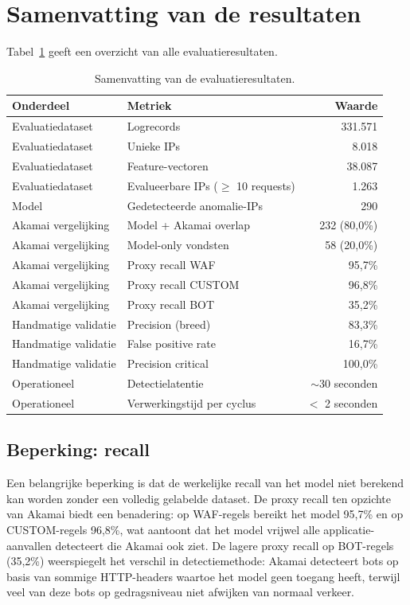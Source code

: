 \section{Samenvatting van de resultaten}
\label{sec:samenvatting-resultaten}
 
Tabel~\ref{tab:samenvatting-resultaten} geeft een overzicht van alle evaluatieresultaten.
 
\begin{table}[h]
\centering
\caption{Samenvatting van de evaluatieresultaten.}
\label{tab:samenvatting-resultaten}
\begin{tabular}{l l r}
\hline
\textbf{Onderdeel} & \textbf{Metriek} & \textbf{Waarde} \\
\hline
Evaluatiedataset & Logrecords & 331.571 \\
Evaluatiedataset & Unieke IPs & 8.018 \\
Evaluatiedataset & Feature-vectoren & 38.087 \\
Evaluatiedataset & Evalueerbare IPs ($\geq$ 10 requests) & 1.263 \\
Model & Gedetecteerde anomalie-IPs & 290 \\
Akamai vergelijking & Model + Akamai overlap & 232 (80,0\%) \\
Akamai vergelijking & Model-only vondsten & 58 (20,0\%) \\
Akamai vergelijking & Proxy recall WAF & 95,7\% \\
Akamai vergelijking & Proxy recall CUSTOM & 96,8\% \\
Akamai vergelijking & Proxy recall BOT & 35,2\% \\
Handmatige validatie & Precision (breed) & 83,3\% \\
Handmatige validatie & False positive rate & 16,7\% \\
Handmatige validatie & Precision critical & 100,0\% \\
Operationeel & Detectielatentie & $\sim$30 seconden \\
Operationeel & Verwerkingstijd per cyclus & $<$ 2 seconden \\
\hline
\end{tabular}
\end{table}
 
\subsection{Beperking: recall}
 
Een belangrijke beperking is dat de werkelijke recall van het model niet berekend kan worden zonder een volledig gelabelde dataset. De proxy recall ten opzichte van Akamai biedt een benadering: op WAF-regels bereikt het model 95,7\% en op CUSTOM-regels 96,8\%, wat aantoont dat het model vrijwel alle applicatie-aanvallen detecteert die Akamai ook ziet. De lagere proxy recall op BOT-regels (35,2\%) weerspiegelt het verschil in detectiemethode: Akamai detecteert bots op basis van sommige HTTP-headers waartoe het model geen toegang heeft, terwijl veel van deze bots op gedragsniveau niet afwijken van normaal verkeer.
 
